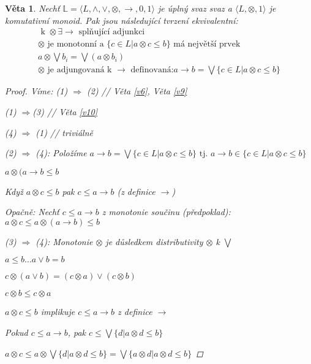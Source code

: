 \documentclass[10pt, a4paper, titlepage]{article}
\theoremstyle{note}
\newtheorem{veta}{Věta}
\newcommand{\rlat}{\langle L, \wedge, \vee,\otimes,\rightarrow,0,1\rangle}
\begin{document}
\begin{veta}
Nechť $\mathbb{L} = \rlat$ je úplný svaz svaz a $\langle L,\otimes, 1\rangle$ je komutativní monoid. Pak jsou následující tvrzení ekvivalentní:
\begin{eqnarray}
\text{ k } \otimes \exists \rightarrow \text{ splňující adjunkci} \\
\otimes \text{ je monotonní a } \{c\in L | a\otimes c\leq b\} \text{ má největší prvek}\\
a\otimes\bigvee b_{i} = \bigvee (a\otimes b_{i})\\
\otimes \text{ je adjungovaná k }\rightarrow \text{ definovaná:} a\rightarrow b =\bigvee\{c\in L|a\otimes c\leq b\} 
\end{eqnarray}
\begin{proof}
Víme: (1) $\Rightarrow$ (2) // Věta \ref{v6}, Věta \ref{v9}

(1) $\Rightarrow$(3) // Věta \ref{v10}

(4) $\Rightarrow$ (1) // triviálně

(2) $\Rightarrow$ (4): Položíme $a\rightarrow b = \bigvee\{c\in L|a\otimes c\leq b\} \text{ tj. } a\rightarrow b \in\{c\in L|a\otimes c\leq b\}$

$a\otimes(a\rightarrow b\leq b$

Když $a\otimes c\leq b$ pak $c\leq a\rightarrow b$ (z definice $\rightarrow$)

Opačně: Nechť $c\leq a\rightarrow b$ z monotonie součinu (předpoklad): $a\otimes c\leq a\otimes (a\rightarrow b)\leq b$


(3) $\Rightarrow$ (4): Monotonie $\otimes$ je důsledkem distributivity $\otimes$ k $\bigvee$

$a\leq b \dots a\vee b = b$

$c\otimes(a\vee b) = (c\otimes a) \vee (c\otimes b)$

$c\otimes b\leq c\otimes a$

$a\otimes c\leq b$ implikuje $c\leq a\rightarrow b$ z definice $\rightarrow$

Pokud $c\leq a\rightarrow b$, pak $c\leq \bigvee\{d|a\otimes d\leq b\}$

$a\otimes c\leq a\otimes \bigvee\{d|a\otimes d\leq b\} = \bigvee\{a\otimes d| a\otimes d\leq b\}$
\end{proof}
\end{veta}
\renewcommand{\indexcolumns}{3}
\printindex
\end{document}
